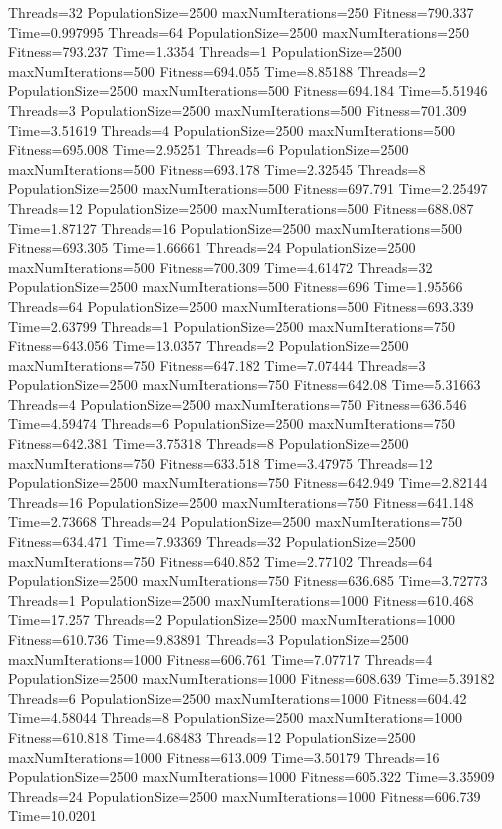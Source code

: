 \documentclass[10pt,letterpaper]{article}
\begin{document}
Threads=32 PopulationSize=2500 maxNumIterations=250 Fitness=790.337 Time=0.997995
Threads=64 PopulationSize=2500 maxNumIterations=250 Fitness=793.237 Time=1.3354
Threads=1 PopulationSize=2500 maxNumIterations=500 Fitness=694.055 Time=8.85188
Threads=2 PopulationSize=2500 maxNumIterations=500 Fitness=694.184 Time=5.51946
Threads=3 PopulationSize=2500 maxNumIterations=500 Fitness=701.309 Time=3.51619
Threads=4 PopulationSize=2500 maxNumIterations=500 Fitness=695.008 Time=2.95251
Threads=6 PopulationSize=2500 maxNumIterations=500 Fitness=693.178 Time=2.32545
Threads=8 PopulationSize=2500 maxNumIterations=500 Fitness=697.791 Time=2.25497
Threads=12 PopulationSize=2500 maxNumIterations=500 Fitness=688.087 Time=1.87127
Threads=16 PopulationSize=2500 maxNumIterations=500 Fitness=693.305 Time=1.66661
Threads=24 PopulationSize=2500 maxNumIterations=500 Fitness=700.309 Time=4.61472
Threads=32 PopulationSize=2500 maxNumIterations=500 Fitness=696 Time=1.95566
Threads=64 PopulationSize=2500 maxNumIterations=500 Fitness=693.339 Time=2.63799
Threads=1 PopulationSize=2500 maxNumIterations=750 Fitness=643.056 Time=13.0357
Threads=2 PopulationSize=2500 maxNumIterations=750 Fitness=647.182 Time=7.07444
Threads=3 PopulationSize=2500 maxNumIterations=750 Fitness=642.08 Time=5.31663
Threads=4 PopulationSize=2500 maxNumIterations=750 Fitness=636.546 Time=4.59474
Threads=6 PopulationSize=2500 maxNumIterations=750 Fitness=642.381 Time=3.75318
Threads=8 PopulationSize=2500 maxNumIterations=750 Fitness=633.518 Time=3.47975
Threads=12 PopulationSize=2500 maxNumIterations=750 Fitness=642.949 Time=2.82144
Threads=16 PopulationSize=2500 maxNumIterations=750 Fitness=641.148 Time=2.73668
Threads=24 PopulationSize=2500 maxNumIterations=750 Fitness=634.471 Time=7.93369
Threads=32 PopulationSize=2500 maxNumIterations=750 Fitness=640.852 Time=2.77102
Threads=64 PopulationSize=2500 maxNumIterations=750 Fitness=636.685 Time=3.72773
Threads=1 PopulationSize=2500 maxNumIterations=1000 Fitness=610.468 Time=17.257
Threads=2 PopulationSize=2500 maxNumIterations=1000 Fitness=610.736 Time=9.83891
Threads=3 PopulationSize=2500 maxNumIterations=1000 Fitness=606.761 Time=7.07717
Threads=4 PopulationSize=2500 maxNumIterations=1000 Fitness=608.639 Time=5.39182
Threads=6 PopulationSize=2500 maxNumIterations=1000 Fitness=604.42 Time=4.58044
Threads=8 PopulationSize=2500 maxNumIterations=1000 Fitness=610.818 Time=4.68483
Threads=12 PopulationSize=2500 maxNumIterations=1000 Fitness=613.009 Time=3.50179
Threads=16 PopulationSize=2500 maxNumIterations=1000 Fitness=605.322 Time=3.35909
Threads=24 PopulationSize=2500 maxNumIterations=1000 Fitness=606.739 Time=10.0201
\end{document}

